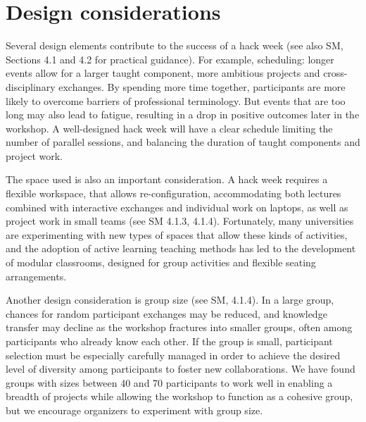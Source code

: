 \section*{Design considerations}

Several design elements contribute to the success of a hack week (see also SM, Sections 4.1 and 4.2 for practical guidance).
For example, scheduling: longer events allow for a larger taught component, more ambitious projects and cross-disciplinary exchanges.
By spending more time together, participants are more likely to overcome barriers of professional terminology.
But events that are too long may also lead to fatigue, resulting in a drop in positive outcomes later in the workshop.
A well-designed hack week will have a clear schedule limiting the number of parallel sessions, and balancing the duration of taught components and project work.

The space used is also an important consideration. A hack week requires a flexible workspace, that allows re-configuration, accommodating both lectures combined with interactive exchanges and individual work on laptops, as well as project work in small teams (see SM 4.1.3, 4.1.4).
Fortunately, many universities are experimenting with new types of spaces that allow these kinds of activities, and the adoption of active learning teaching methods \cite{prince2004} has led to the development of modular classrooms, designed for group activities and flexible seating arrangements.

Another design consideration is group size (see SM, 4.1.4).
In a large group, chances for random participant exchanges may be reduced, and knowledge transfer may decline as the workshop fractures into smaller groups, often among participants who already know each other.
If the group is small, participant selection must be especially carefully managed in order to achieve the desired level of diversity among participants to foster new collaborations.
We have found groups with sizes between 40 and 70 participants to work well in enabling a breadth of projects while allowing the workshop to function as a cohesive group, but we encourage organizers to experiment with group size.


